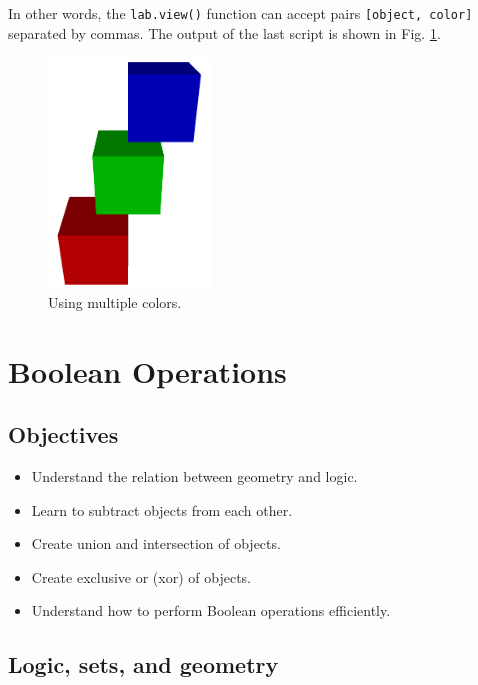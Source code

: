 \noindent
In other words, the {\tt lab.view()} function can accept pairs {\tt [object, color]} separated
by commas. The output of the last script is shown in Fig. \ref{fig:comp-1k}.

\begin{figure}[!ht]
\begin{center}
\includegraphics[width=0.39\textwidth]{img/multicolor-1.png}
\end{center}
\vspace{-4mm}
\caption{Using multiple colors.}
\label{fig:comp-1k}
\end{figure}



\section{Boolean Operations}

\subsection{Objectives}
\begin{itemize}
\item Understand the relation between geometry and logic.
\item Learn to subtract objects from each other.
\item Create union and intersection of objects.
\item Create exclusive or (xor) of objects.
\item Understand how to perform Boolean operations efficiently.
\end{itemize}

\subsection{Logic, sets, and geometry}

